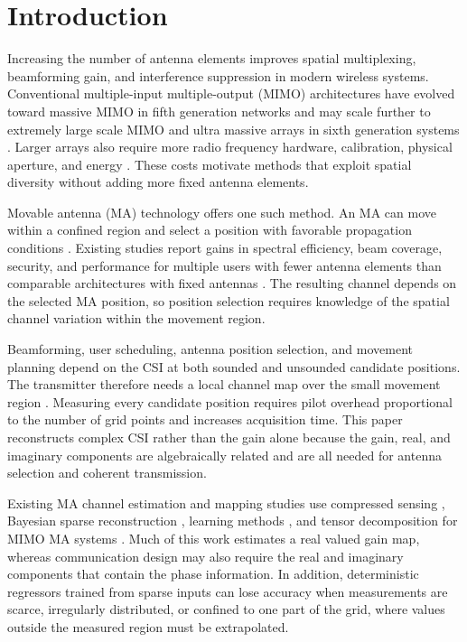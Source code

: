 \documentclass[lettersize,journal]{IEEEtran}
\begin{document}
\section{Introduction}

Increasing the number of antenna elements improves spatial multiplexing, beamforming gain, and interference suppression in modern wireless systems. Conventional multiple-input multiple-output (MIMO) architectures have evolved toward massive MIMO in fifth generation networks and may scale further to extremely large scale MIMO and ultra massive arrays in sixth generation systems \cite{ref_xlmimo_tutorial,ref_ultra_massive_beamforming,ref_near_far_field}. Larger arrays also require more radio frequency hardware, calibration, physical aperture, and energy \cite{ref_ultra_massive_beamforming,ref_near_far_field}. These costs motivate methods that exploit spatial diversity without adding more fixed antenna elements.

Movable antenna (MA) technology offers one such method. An MA can move within a confined region and select a position with favorable propagation conditions \cite{ref_ma_opportunities,ref_ma_modeling}. Existing studies report gains in spectral efficiency, beam coverage, security, and performance for multiple users with fewer antenna elements than comparable architectures with fixed antennas \cite{ref_ma_multiuser,ref_ma_graph,ref_ma_spectrum,ref_ma_beam_coverage,ref_ma_security}. The resulting channel depends on the selected MA position, so position selection requires knowledge of the spatial channel variation within the movement region.

Beamforming, user scheduling, antenna position selection, and movement planning depend on the CSI at both sounded and unsounded candidate positions. The transmitter therefore needs a local channel map over the small movement region \cite{ref_ma_modeling}. Measuring every candidate position requires pilot overhead proportional to the number of grid points and increases acquisition time. This paper reconstructs complex CSI rather than the gain alone because the gain, real, and imaginary components are algebraically related and are all needed for antenna selection and coherent transmission.

Existing MA channel estimation and mapping studies use compressed sensing \cite{ref_cs,ref_cs_framework}, Bayesian sparse reconstruction \cite{ref_sbar}, learning methods \cite{ref_agmae}, and tensor decomposition for MIMO MA systems \cite{ref_tensor}. Much of this work estimates a real valued gain map, whereas communication design may also require the real and imaginary components that contain the phase information. In addition, deterministic regressors trained from sparse inputs can lose accuracy when measurements are scarce, irregularly distributed, or confined to one part of the grid, where values outside the measured region must be extrapolated.
\end{document}
